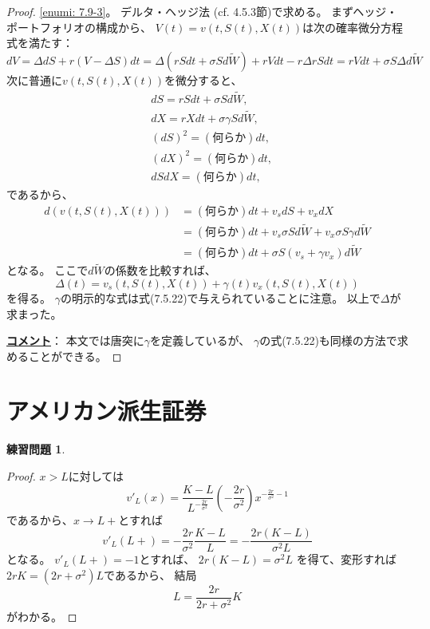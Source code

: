 \documentclass[uplatex]{jsarticle}
\theoremstyle{definition}
\newtheorem{prob}[prob]{練習問題}
\begin{document}
\begin{proof}
  \ref{enumi: 7.9-3}。
  デルタ・ヘッジ法 (cf. 4.5.3節)で求める。
  まずヘッジ・ポートフォリオの構成から、
  \(V(t) = v(t,S(t),X(t))\)は次の確率微分方程式を満たす：
  \[
  dV = \Delta dS + r(V-\Delta S) dt
  = \Delta \left( rSdt + \sigma Sd\tilde{W}\right)
  + rVdt - r\Delta rSdt
  = rVdt + \sigma S \Delta d\tilde{W}
  \]
  次に普通に\(v(t,S(t),X(t))\)を微分すると、
  \begin{align*}
    &dS = rS dt + \sigma Sd\tilde{W}, \\
    &dX = rXdt + \sigma \gamma S d\tilde{W}, \\
    &(dS)^2 = (\text{何らか})dt, \\
    &(dX)^2 = (\text{何らか})dt, \\
    &dSdX = (\text{何らか})dt,
  \end{align*}
  であるから、
  \begin{align*}
    d\left(v\left(t,S(t),X(t)\right)\right)
    &= (\text{何らか})dt + v_sdS + v_xdX \\
    &= (\text{何らか})dt + v_s\sigma Sd\tilde{W}
    + v_x\sigma S \gamma d\tilde{W} \\
    &= (\text{何らか})dt
    + \sigma S\left( v_s + \gamma v_x\right)d\tilde{W}
  \end{align*}
  となる。
  ここで\(d\tilde{W}\)の係数を比較すれば、
  \[
  \Delta(t) = v_s(t,S(t),X(t)) + \gamma(t)v_x(t,S(t),X(t))
  \]
  を得る。
  \(\gamma\)の明示的な式は式(7.5.22)で与えられていることに注意。
  以上で\(\Delta\)が求まった。

  \underline{\textbf{コメント}}：
  本文では唐突に\(\gamma\)を定義しているが、
  \(\gamma\)の式(7.5.22)も同様の方法で求めることができる。
\end{proof}









\newpage

\section{アメリカン派生証券}\label{section: 8}



\begin{prob}\label{prob: 8.1}
\end{prob}

\begin{proof}
  \(x > L \)に対しては
  \[
  v'_L(x) = \frac{K-L}{L^{-\frac{2r}{\sigma^2}}}
  \left( -\frac{2r}{\sigma^2}\right) x^{-\frac{2r}{\sigma^2}-1}
  \]
  であるから、\(x\to L+\)とすれば
  \[
  v'_L(L+)
  = -\frac{2r}{\sigma^2}\frac{K-L}{L}
  = -\frac{2r(K-L)}{\sigma^2L}
  \]
  となる。
  \(v'_L(L+) = -1\)とすれば、
  \(2r(K-L) = \sigma^2L\)
  を得て、変形すれば\(2rK = (2r + \sigma^2)L\)であるから、
  結局
  \[
  L = \frac{2r}{2r+\sigma^2}K
  \]
  がわかる。
\end{proof}
\end{document}
